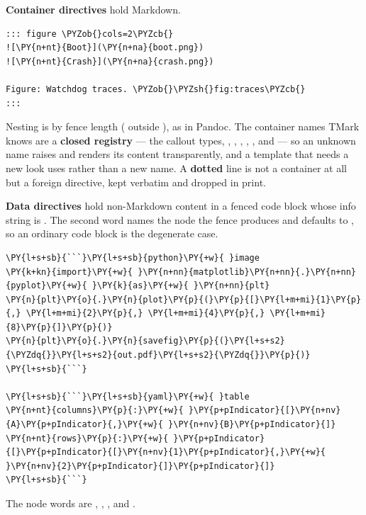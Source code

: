 \documentclass[a4paper,twoside]{article}
\begin{document}
\textbf{Container directives} hold Markdown.
\begin{tscode}[lang=md, engine=pygments]
\begin{Verbatim}[commandchars=\\\{\},breaklines, breakanywhere, commandchars=\\\{\}]
::: figure \PYZob{}cols=2\PYZcb{}
![\PY{n+nt}{Boot}](\PY{n+na}{boot.png})
![\PY{n+nt}{Crash}](\PY{n+na}{crash.png})

Figure: Watchdog traces. \PYZob{}\PYZsh{}fig:traces\PYZcb{}
:::
\end{Verbatim}
\end{tscode}
Nesting is by fence length (\tscodeinline{::::} outside \tscodeinline{:::}), as in Pandoc. The container
names TMark knows are a \textbf{closed registry} --- the callout types, ,
, , , ,  and  --- so an unknown name
raises  and renders its content transparently, and a
template that needs a new look uses  rather than a new name.
A \textbf{dotted}  line is not a container at all but a foreign
directive, kept verbatim and dropped in print.

\textbf{Data directives} hold non-Markdown content in a fenced code block whose info
string is . The second word names the node the fence produces and
defaults to , so an ordinary code block is the degenerate case.
\begin{tscode}[lang=md, engine=pygments]
\begin{Verbatim}[commandchars=\\\{\},breaklines, breakanywhere, commandchars=\\\{\}]
\PY{l+s+sb}{```}\PY{l+s+sb}{python}\PY{+w}{ }image
\PY{k+kn}{import}\PY{+w}{ }\PY{n+nn}{matplotlib}\PY{n+nn}{.}\PY{n+nn}{pyplot}\PY{+w}{ }\PY{k}{as}\PY{+w}{ }\PY{n+nn}{plt}
\PY{n}{plt}\PY{o}{.}\PY{n}{plot}\PY{p}{(}\PY{p}{[}\PY{l+m+mi}{1}\PY{p}{,} \PY{l+m+mi}{2}\PY{p}{,} \PY{l+m+mi}{4}\PY{p}{,} \PY{l+m+mi}{8}\PY{p}{]}\PY{p}{)}
\PY{n}{plt}\PY{o}{.}\PY{n}{savefig}\PY{p}{(}\PY{l+s+s2}{\PYZdq{}}\PY{l+s+s2}{out.pdf}\PY{l+s+s2}{\PYZdq{}}\PY{p}{)}
\PY{l+s+sb}{```}

\PY{l+s+sb}{```}\PY{l+s+sb}{yaml}\PY{+w}{ }table
\PY{n+nt}{columns}\PY{p}{:}\PY{+w}{ }\PY{p+pIndicator}{[}\PY{n+nv}{A}\PY{p+pIndicator}{,}\PY{+w}{ }\PY{n+nv}{B}\PY{p+pIndicator}{]}
\PY{n+nt}{rows}\PY{p}{:}\PY{+w}{ }\PY{p+pIndicator}{[}\PY{p+pIndicator}{[}\PY{n+nv}{1}\PY{p+pIndicator}{,}\PY{+w}{ }\PY{n+nv}{2}\PY{p+pIndicator}{]}\PY{p+pIndicator}{]}
\PY{l+s+sb}{```}
\end{Verbatim}
\end{tscode}
The node words are , , ,  and .
\end{document}
